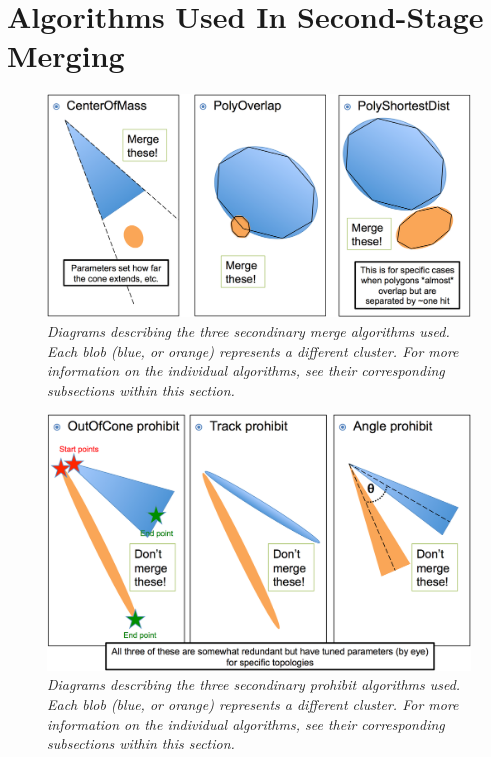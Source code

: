 \documentclass{article}
\begin{document}
\newpage
\section{Algorithms Used In Second-Stage Merging} \label{sec:SecondMerging}
\begin{figure}[h!]
\begin{center}
\includegraphics[width=140mm]{Figures/second_merge_algos.png}
\end{center}
\caption{\textit{Diagrams describing the three secondinary merge algorithms used. Each blob (blue, or orange) represents 
a different cluster. For more information on the individual algorithms, see their corresponding subsections within this 
section.}}
\label{second_merge_algos_fig}
\end{figure}

\begin{figure}[h!]
\begin{center}
\includegraphics[width=140mm]{Figures/second_prohibit_algos.png}
\end{center}
\caption{\textit{Diagrams describing the three secondinary prohibit algorithms used. Each blob (blue, or orange)
represents a different cluster. For more information on the individual algorithms, see their corresponding 
subsections within this section.}}
\label{second_prohibit_algos_fig}
\end{figure}
\end{document}
